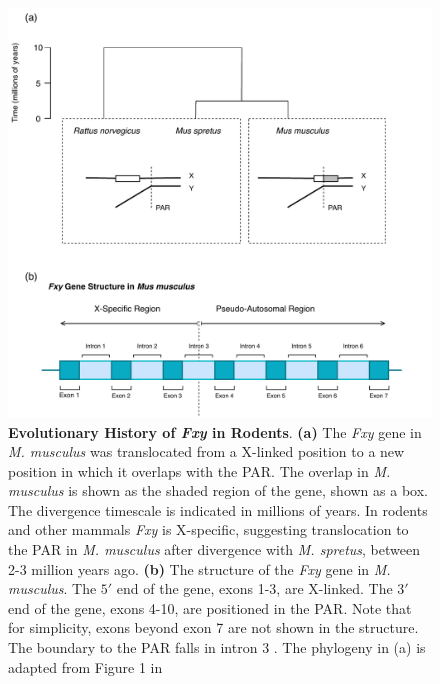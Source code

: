 \begin{figure}[htbp]
\centering
\includegraphics[width=\textwidth]{figures/diagrams/Fxy.pdf}
\caption{\textbf{Evolutionary History of \textit{Fxy} in Rodents}. \textbf{(a)} The \textit{Fxy} gene in \textit{M. musculus} was translocated from a X-linked position to a new position in which it overlaps with the PAR. The overlap in \textit{M. musculus} is shown as the shaded region of the gene, shown as a box. The divergence timescale is indicated in millions of years. In rodents and other mammals \textit{Fxy} is X-specific, suggesting translocation to the PAR in \textit{M. musculus} after divergence with \textit{M. spretus}, between 2-3 million years ago. \textbf{(b)} The structure of the \textit{Fxy} gene in \textit{M. musculus}. The $5'$ end of the gene, exons 1-3, are X-linked. The $3'$ end of the gene, exons 4-10, are positioned in the PAR. Note that for simplicity, exons beyond exon 7 are not shown in the structure. The boundary to the PAR falls in intron 3 \citep{Palmer1997AMice}. The phylogeny in (a) is adapted from Figure 1 in \cite{Galtier2007AdaptationEvolution}}
\label{fig:Fxy}
\end{figure}